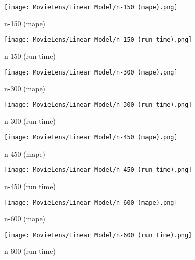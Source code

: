 \documentclass[12pt]{article}
\begin{document}
\begin{figure}[H]
\centering
    \begin{minipage}{0.45\textwidth}
        \centering
        \texttt{[image: MovieLens/Linear Model/n-150 (mape).png]}
        \caption{n-150 (mape)}
        
    \end{minipage}\hfill
    \begin{minipage}{0.45\textwidth}
        \centering
        \texttt{[image: MovieLens/Linear Model/n-150 (run time).png]}
        \caption{n-150 (run time)}
    \end{minipage}
\end{figure}

\begin{figure}[H]
\centering
    \begin{minipage}{0.45\textwidth}
        \centering
        \texttt{[image: MovieLens/Linear Model/n-300 (mape).png]}
        \caption{n-300 (mape)}
        
    \end{minipage}\hfill
    \begin{minipage}{0.45\textwidth}
        \centering
        \texttt{[image: MovieLens/Linear Model/n-300 (run time).png]}
        \caption{n-300 (run time)}
    \end{minipage}
\end{figure}

\begin{figure}[H]
\centering
    \begin{minipage}{0.45\textwidth}
        \centering
        \texttt{[image: MovieLens/Linear Model/n-450 (mape).png]}
        \caption{n-450 (mape)}
        
    \end{minipage}\hfill
    \begin{minipage}{0.45\textwidth}
        \centering
        \texttt{[image: MovieLens/Linear Model/n-450 (run time).png]}
        \caption{n-450 (run time)}
    \end{minipage}
\end{figure}

\begin{figure}[H]
\centering
    \begin{minipage}{0.45\textwidth}
        \centering
        \texttt{[image: MovieLens/Linear Model/n-600 (mape).png]}
        \caption{n-600 (mape)}
        
    \end{minipage}\hfill
    \begin{minipage}{0.45\textwidth}
        \centering
        \texttt{[image: MovieLens/Linear Model/n-600 (run time).png]}
        \caption{n-600 (run time)}
    \end{minipage}
\end{figure}
\end{document}
